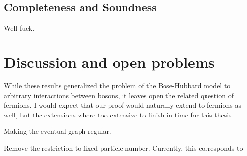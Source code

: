 \documentclass[../thesis-main/thesis-main]{subfiles}
\begin{document}
\subsection{Completeness and Soundness}

Well fuck.


\section{Discussion and open problems}

While these results generalized the problem of the Bose-Hubbard model to arbitrary interactions between bosons, it leaves open the related question of fermions.  I would expect that our proof would naturally extend to fermions as well, but the extensions where too extensive to finish in time for this thesis.

Making the eventual graph regular.

Remove the restriction to fixed particle number.  Currently, this corresponds to 
\end{document}

